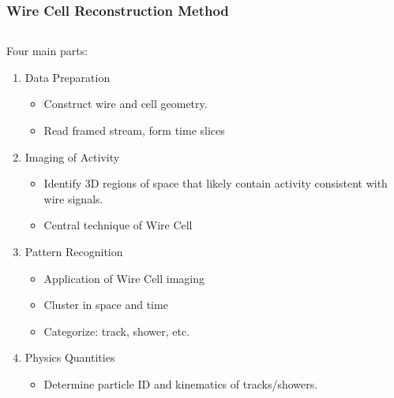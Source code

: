 \documentclass[xcolor=dvipsnames]{beamer}
\begin{document}
\begin{frame}[fragile]
  \frametitle{Wire Cell Reconstruction Method}
  \begin{columns}
    \begin{column}{0.7\textwidth}
      Four main parts:
      \begin{enumerate}
      \item<2> Data Preparation
        \begin{itemize}        \scriptsize
        \item Construct wire and cell geometry.
        \item Read framed stream, form time slices
        \end{itemize}
      \item<3> Imaging of Activity
        \begin{itemize}        \scriptsize
        \item Identify 3D regions of space that likely contain
          activity consistent with wire signals.
        \item Central technique of Wire Cell
        \end{itemize}
      \item<4> Pattern Recognition 
        \begin{itemize}         \scriptsize
        \item Application of Wire Cell imaging
        \item Cluster in space and time
        \item Categorize: track, shower, etc.
        \end{itemize}
      \item<5> Physics Quantities
        \begin{itemize}
        \item Determine particle ID and kinematics of tracks/showers.
        \end{itemize}
      \end{enumerate}
    \end{column}
    \begin{column}{0.3\textwidth}
      \begin{center}
        \vspace{-10mm}
        \resizebox{!}{\textheight}{}
      \end{center}
    \end{column}
  \end{columns}

\end{frame}
\end{document}
